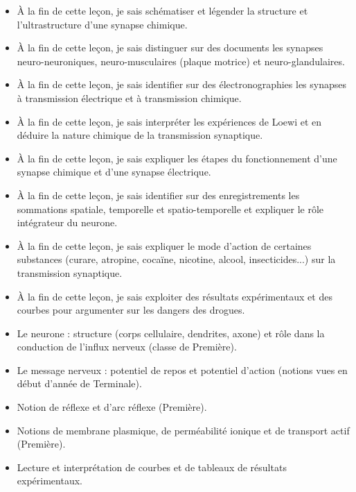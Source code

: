 \documentclass[11pt]{article}
\begin{document}
\begin{objectifs}
\begin{itemize}
\item À la fin de cette leçon, je sais schématiser et légender la structure et l'ultrastructure d'une synapse chimique.
\item À la fin de cette leçon, je sais distinguer sur des documents les synapses neuro-neuroniques, neuro-musculaires (plaque motrice) et neuro-glandulaires.
\item À la fin de cette leçon, je sais identifier sur des électronographies les synapses à transmission électrique et à transmission chimique.
\item À la fin de cette leçon, je sais interpréter les expériences de Loewi et en déduire la nature chimique de la transmission synaptique.
\item À la fin de cette leçon, je sais expliquer les étapes du fonctionnement d'une synapse chimique et d'une synapse électrique.
\item À la fin de cette leçon, je sais identifier sur des enregistrements les sommations spatiale, temporelle et spatio-temporelle et expliquer le rôle intégrateur du neurone.
\item À la fin de cette leçon, je sais expliquer le mode d'action de certaines substances (curare, atropine, cocaïne, nicotine, alcool, insecticides...) sur la transmission synaptique.
\item À la fin de cette leçon, je sais exploiter des résultats expérimentaux et des courbes pour argumenter sur les dangers des drogues.
\end{itemize}
\end{objectifs}

\begin{prerequis}
\begin{itemize}
\item Le neurone : structure (corps cellulaire, dendrites, axone) et rôle dans la conduction de l'influx nerveux (classe de Première).
\item Le message nerveux : potentiel de repos et potentiel d'action (notions vues en début d'année de Terminale).
\item Notion de réflexe et d'arc réflexe (Première).
\item Notions de membrane plasmique, de perméabilité ionique et de transport actif (Première).
\item Lecture et interprétation de courbes et de tableaux de résultats expérimentaux.
\end{itemize}
\end{prerequis}
\end{document}
